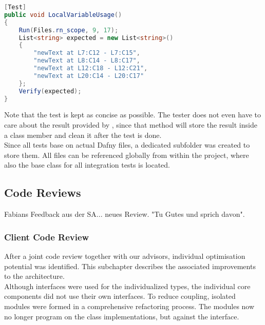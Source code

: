 \begin{lstlisting}[language=csharp, caption={Sample Integration Test}, captionpos=b, label={lst:sampleintegrationtest}]
[Test]
public void LocalVariableUsage()
{
    Run(Files.rn_scope, 9, 17);
    List<string> expected = new List<string>()
    {
        "newText at L7:C12 - L7:C15",
        "newText at L8:C14 - L8:C17",
        "newText at L12:C18 - L12:C21",
        "newText at L20:C14 - L20:C17"
    };
    Verify(expected);
}
\end{lstlisting}

Note that the test is kept as concise as possible. The tester does not even have to care about the result provided by , since that method will store the result inside a class member and clean it after the test is done.\\

Since all tests base on actual Dafny files, a dedicated subfolder was created to store them. All files can be referenced globally from within the  project, where also the base class for all integration tests is located.

\subsection{Code Reviews}
Fabians Feedback aus der SA... neues Review. "Tu Gutes und sprich davon".

\subsubsection{Client Code Review}
After a joint code review together with our advisors, individual optimisation potential was identified.
This subchapter describes the associated improvements to the architecture. \\

Although interfaces were used for the individualized types,
the individual core components did not use their own interfaces.
To reduce coupling, isolated modules were formed in a comprehensive refactoring process.
The modules now no longer program on the class implementations, but against the interface. \\

